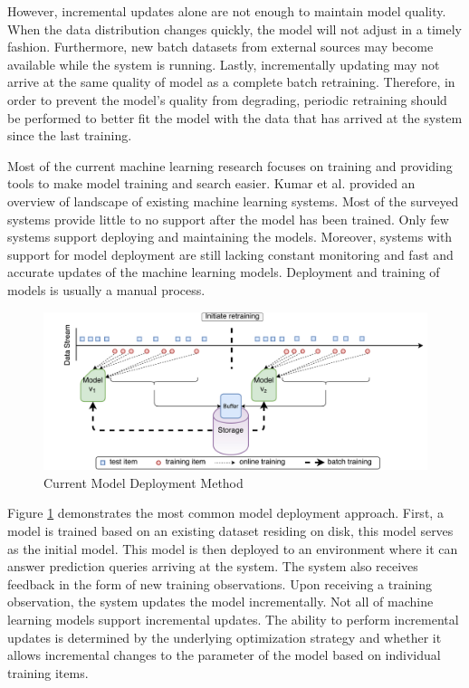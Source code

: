 \documentclass{vldb}
\begin{document}
However, incremental updates alone are not enough to maintain model quality. 
When the data distribution changes quickly, the model will not adjust in a timely fashion. 
Furthermore, new batch datasets from external sources may become available while the system is running.
Lastly, incrementally updating may not arrive at the same quality of model as a complete batch retraining.
Therefore, in order to prevent the model's quality from degrading, periodic retraining should be performed to better fit the model with the data that has arrived at the system since the last training.

Most of the current machine learning research focuses on training and providing tools to make model training and search easier. 
Kumar et al. \cite{kumar2015survey} provided an overview of landscape of existing machine learning systems. 
Most of the surveyed systems provide little to no support after the model has been trained.
Only few systems \cite{akdere2011case, crankshaw2014missing} support deploying and maintaining the models.
Moreover, systems with support for model deployment are still lacking constant monitoring and fast and accurate updates of the machine learning models.
Deployment and training of models is usually a manual process.
\begin{figure}[t]
\centering
\includegraphics[width=.8\textwidth]{../images/velox-1.pdf}
\caption{Current Model Deployment Method}
\label{fig:velox-work-flow}
\end{figure}

Figure \ref{fig:velox-work-flow} demonstrates the most common model deployment approach.
First, a model is trained based on an existing dataset residing on disk, this model serves as the initial model.
This model is then deployed to an environment where it can answer prediction queries arriving at the system.
The system also receives feedback in the form of new training observations.
Upon receiving a training observation, the system updates the model incrementally.
Not all of machine learning models support incremental updates.
The ability to perform incremental updates is determined by the underlying optimization strategy and whether it allows incremental changes to the parameter of the model based on individual training items.
\end{document}
